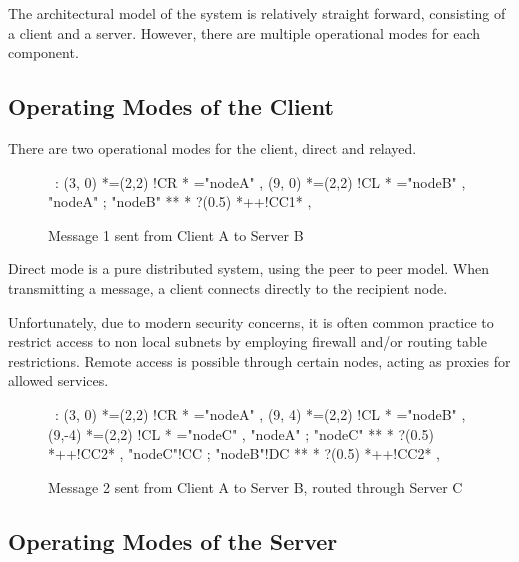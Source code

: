 The architectural model of the system is relatively straight forward,
consisting of a client and a server. However, there are multiple
operational modes for each component.

\subsection{Operating Modes of the Client}

There are two operational modes for the client, direct and relayed.

\begin{figure}[hbt]

\begin{center}
\ \xy<1cm,0cm>:
(3, 0) *=(2,2) !CR  *\frm{-} ="nodeA" , 
(9, 0) *=(2,2) !CL  *\frm{=} ="nodeB" , 
"nodeA" ; "nodeB" **\dir{-} *\dir{>} ?(0.5) *++!CC{1}* , 
\endxy
\end{center}

\caption{Message 1 sent from Client A to Server B}

\end{figure}

Direct mode is a pure distributed system, using the peer to peer model.
When transmitting a message, a client connects directly to the
recipient node.


Unfortunately, due to modern security concerns, it is often common 
practice to restrict access to non local subnets by employing firewall
and/or routing table restrictions. Remote access is possible through
certain nodes, acting as proxies for allowed services. 

\begin{figure}[hbt]

\begin{center}
\ \xy<1cm,0cm>:
(3, 0) *=(2,2) !CR  *\frm{-} ="nodeA" , 
(9, 4) *=(2,2) !CL  *\frm{=} ="nodeB" , 
(9,-4) *=(2,2) !CL  *\frm{=} ="nodeC" , 
"nodeA" ; "nodeC" **\dir{-} *\dir{>} ?(0.5) *++!CC{2}* , 
"nodeC"!CC ; "nodeB"!DC **\dir{-} *\dir{>} ?(0.5) *++!CC{2}* , 
\endxy
\end{center}

\caption{Message 2 sent from Client A to Server B, routed through Server C}

\end{figure}

\subsection{Operating Modes of the Server}

